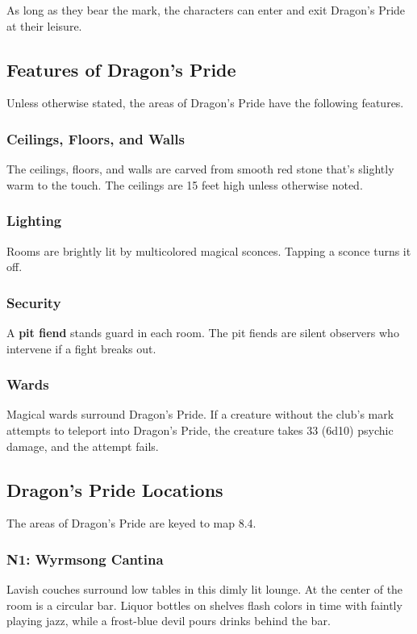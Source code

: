 \documentclass[10pt,a4paper,twoside,bg=print,twocolumn,openany,nodeprecatedcode]{dndbook}
\begin{document}
As long as they bear the mark, the characters can enter and exit Dragon's Pride at their leisure.

\subsection{Features of Dragon's Pride}
Unless otherwise stated, the areas of Dragon's Pride have the following features.

\subsubsection{Ceilings, Floors, and Walls}
The ceilings, floors, and walls are carved from smooth red stone that's slightly warm to the touch. The ceilings are 15 feet high unless otherwise noted.

\subsubsection{Lighting}
Rooms are brightly lit by multicolored magical sconces. Tapping a sconce turns it off.

\subsubsection{Security}
A \textbf{pit fiend} stands guard in each room. The pit fiends are silent observers who intervene if a fight breaks out.

\subsubsection{Wards}
Magical wards surround Dragon's Pride. If a creature without the club's mark attempts to teleport into Dragon's Pride, the creature takes 33 (6d10) psychic damage, and the attempt fails.

\subsection{Dragon's Pride Locations}
The areas of Dragon's Pride are keyed to map 8.4.

\subsubsection{N1: Wyrmsong Cantina}
\begin{DndReadAloud}{}
Lavish couches surround low tables in this dimly lit lounge. At the center of the room is a circular bar. Liquor bottles on shelves flash colors in time with faintly playing jazz, while a frost-blue devil pours drinks behind the bar.

\end{DndReadAloud}
\end{document}
